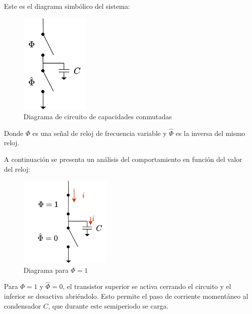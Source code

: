 \documentclass[12pt]{report} %
\begin{document}
	Este es el diagrama simbólico del sistema:
	
	\begin{figure}[H]
		\includegraphics[width=0.3\textwidth]{sw-capacities-symbol-1.png}
		\caption[Diagrama de circuito de capacidades conmutadas]{Diagrama de circuito de capacidades conmutadas}
		\label{fig:sw-capacities-symbol-1.png}
	\end{figure}

	Donde $\Phi$ es una señal de reloj de frecuencia variable y $\hat{\Phi}$ es la inversa del mismo reloj.
	
	A continuación se presenta un análisis del comportamiento en función del valor del reloj:
	
	\begin{figure}[H]
		\includegraphics[width=0.4\textwidth]{sw-capacities-symbol-2.png}
		\caption[Diagrama para $\Phi=1$]{Diagrama para $\Phi=1$}
		\label{fig:sw-capacities-symbol-2.png}
	\end{figure}
	Para $\Phi = 1$ y $\hat{\Phi} = 0$, el transistor superior se activa cerrando el circuito y el inferior se desactiva abriéndolo. Esto permite el paso de corriente momentáneo al condensador $C$, que durante este semiperiodo se carga.
	
\end{document}
